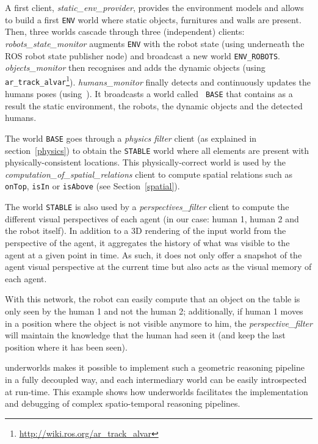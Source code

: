 \documentclass[letterpaper, 10pt, conference]{ieeeconf}
\newcommand{\uwds}{{\sc underworlds}\xspace}
\begin{document}
A first client, \textit{static\_env\_provider}, provides the environment models and
allows to build a first \texttt{ENV} world where static objects, furnitures and
walls are present.  Then, three worlds cascade through three (independent)
clients: \textit{robots\_state\_monitor} augments {\tt ENV} with the robot state
(using underneath the ROS robot state publisher node) and broadcast a new world
{\tt ENV\_ROBOTS}. \textit{objects\_monitor} then recognises and adds the
dynamic objects (using {\tt
ar\_track\_alvar}\footnote{\url{http://wiki.ros.org/ar_track_alvar}}).
\textit{humans\_monitor} finally detects and continuously updates the humans
poses (using~\cite{Khalidov_Idiap-RR-02-2017}). It broadcasts a world called {\tt
BASE} that contains as a result the static environment, the robots, the dynamic
objects and the detected humans.

The world \texttt{BASE} goes through a \textit{physics filter} client (as
explained in section~\ref{physics}) to obtain the \texttt{STABLE} world where all
elements are present with physically-consistent locations. This
physically-correct world is used by the
\textit{computation\_of\_spatial\_relations} client to compute spatial relations
such as {\tt onTop}, {\tt isIn} or {\tt isAbove} (see Section~\ref{spatial}).

The world \texttt{STABLE} is also used by a \textit{perspectives\_filter} client
to compute the different visual perspectives of each agent (in our case: human
1, human 2 and the robot itself). In addition to a 3D rendering of the input
world from the perspective of the agent, it aggregates the history of what was
visible to the agent at a given point in time. As such, it does not only offer a
snapshot of the agent visual perspective at the current time but also acts as the
visual memory of each agent.


With this network, the robot can easily compute that an object on
the table is only seen by the human 1 and not the human 2; additionally, if
human 1 moves in a position where the object is not visible anymore to him, the
\textit{perspective\_filter} will maintain the knowledge that the human had
seen it (and keep the last position where it has been seen).

\uwds makes it possible to implement such a geometric reasoning pipeline in a
fully decoupled way, and each intermediary world can be easily introspected at
run-time. This example shows how \uwds facilitates the implementation and
debugging of complex spatio-temporal reasoning pipelines.
\end{document}

